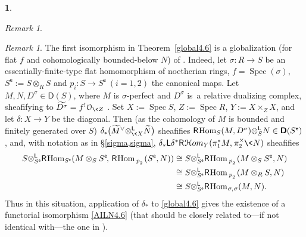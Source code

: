 \documentclass{compositio}
\theoremstyle{plain}
\theoremstyle{definition}
\newtheorem{cosa}[thm]{}
\theoremstyle{remark}
\newtheorem{subrem}[equation]{Remark}
\numberwithin{equation}{thm}
\begin{document}
\begin{cosa}
\begin{subrem}
\end{subrem}

\pagebreak[3]
\begin{subrem}\label{globalization}
The first isomorphism in Theorem~\ref{global4.6}  is a globalization (for flat  $f$
and cohomologically bounded-below $N$) of \cite[Theorem\,4.6]{AILN}.  \mbox{Indeed,} let $\sigma\colon R\to S$ be an essentially-finite-type flat homomorphism of noetherian rings,  $f=\operatorname{Spec}(\sigma)$, ${{S}^{\mathsf e}}{\!:=} S\otimes_R S$ and $p_i\colon S\to{{S}^{\mathsf e}}\ (i=1,2)$ the canonical maps. 
Let   $M,N,D^\sigma\in{\boldsymbol{\mathsf{D}}}(S)$, where $M$ is \mbox{$\sigma$-perfect} and $D^\sigma$ is~a relative dualizing complex, sheafifying to \mbox{$\widetilde{D^\sigma}=f^!{\mathcal O_{\<Z}}$} \cite[Example 2.3.2]{AIL}.   Set $X{\!:=}\operatorname{Spec} S$, $Z{\!:=}\operatorname{Spec} R$, $Y{\!:=} X\times_ZX$, and let $\delta\colon X\to Y$ be the diagonal.
Then (as the cohomology of $M$ is bounded and finitely generated over $S$)
$\delta_*{\mkern-1mu}\big({\widetilde M}^\vee{\otimes^{\mathsf L}_{{{\mkern-1mu}\<X}}}\widetilde N\big)$ sheafifies 
${\mathsf R}{\mkern-1mu}{\mkern-1mu}\operatorname{Hom}_S(M,D^\sigma){\otimes^{\mathsf L}_{{S}}}N\in{\boldsymbol{\mathsf{D}}}({{S}^{\mathsf e}})$,
and, with notation as in \S\ref{sigma,sigma}, $\delta_*{\mathsf L}\delta^*{\mathsf R}{\mkern1mu}{{\mathcal H} om}_Y(\pi_1^*M,{\mkern1mu}\pi_2^\times {\mkern-1mu}\<N)$ sheafifies{}
\begin{align*} S{\otimes^{\mathsf L}_{{{{{S}^{\mathsf e}}}}}}{\mathsf R}{\mkern-1mu}{\mkern-1mu}\operatorname{Hom}_{{{S}^{\mathsf e}}}(M\otimes_S {{S}^{\mathsf e}}{\mkern-1mu}{\mkern-1mu},\,{\mathsf R}{\mkern-1mu}{\mkern-1mu}\operatorname{Hom}_{\>p^{}_2}{\mkern-1mu}({{{S}^{\mathsf e}}},N))
&\cong S{\otimes^{\mathsf L}_{{{{{S}^{\mathsf e}}}}}}{\mathsf R}{\mkern-1mu}{\mkern-1mu}\operatorname{Hom}_{\>p^{}_2}{\mkern-1mu}(M\otimes_S {{S}^{\mathsf e}},N)\\
&\cong S{\otimes^{\mathsf L}_{{{{{S}^{\mathsf e}}}}}}{\mathsf R}{\mkern-1mu}{\mkern-1mu}\operatorname{Hom}_{\>p^{}_2}{\mkern-1mu}(M\otimes_R S,N)\\
&\cong S{\otimes^{\mathsf L}_{{{{{S}^{\mathsf e}}}}}}{\mathsf R}{\mkern-1mu}{\mkern-1mu}\operatorname{Hom}_{{\mkern1mu}\sigma{\mkern-1mu},{\mkern1mu}\sigma}(M,N).
\end{align*}
Thus in this situation, application of $\delta_{*}$ to \eqref{global4.6} gives the existence of a functorial isomorphism \eqref{AILN4.6}
(that should be closely related to---if not identical with---the one in \cite[4.6]{AILN}).
\end{subrem}


\end{cosa}
\end{document}
